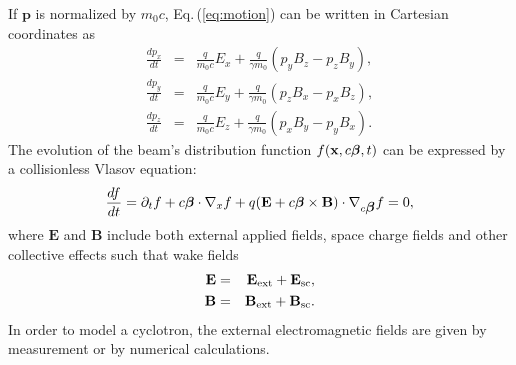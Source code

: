 \documentclass[aps,prstab,twocolumn,superscriptaddress,showpacs]{revtex4}
\newcommand{\bs}[1]{\mathbf #1}
\begin{document}
If $\bs{p}$ is normalized by $m_0c$, 
Eq.\,(\ref{eq:motion}) can be written in Cartesian coordinates as 
\begin{eqnarray}\label{eq:motion2}
  \frac{dp_x}{dt} & = & \frac{q}{m_0c}E_x + \frac{q}{\gamma m_0}(p_y B_z - p_z B_y),    \nonumber \\
  \frac{dp_y}{dt} & = & \frac{q}{m_0c}E_y + \frac{q}{\gamma m_0}(p_z B_x - p_x B_z),   \\
  \frac{dp_z}{dt} & = & \frac{q}{m_0c}E_z + \frac{q}{\gamma m_0}(p_x B_y - p_y B_x).    \nonumber 
\end{eqnarray}
The evolution of the beam's distribution function $ f(\bs {x},c\mbox{\boldmath$\beta$},t)$ can be expressed by a collisionless Vlasov equation:
\begin{equation}\label{eq:Vlasov}
  \frac{df}{dt}=\partial_t f + c\mbox{\boldmath$\beta$} \cdot \nabla_x f +q(\bs{E}+ c\mbox{\boldmath$\beta$}\times\bs{B})\cdot \nabla_{c\mbox{\boldmath$\beta$}} f  =  0, 
\end{equation}
where $\bs{E}$ and $\bs{B}$ include both external applied fields, space charge fields and other collective effects such that wake fields
\begin{eqnarray}\label{eq:Allfield}
  \bs{E} & = & \bs{E_{\RM{ext}}}+\bs{E_{\RM{sc}}}, \nonumber\\    
  \bs{B} & = & \bs{B_{\RM{ext}}}+\bs{B_{\RM{sc}}}.
\end{eqnarray}
In order to model a cyclotron, the external electromagnetic fields are given by measurement or by numerical calculations. 
\end{document}
